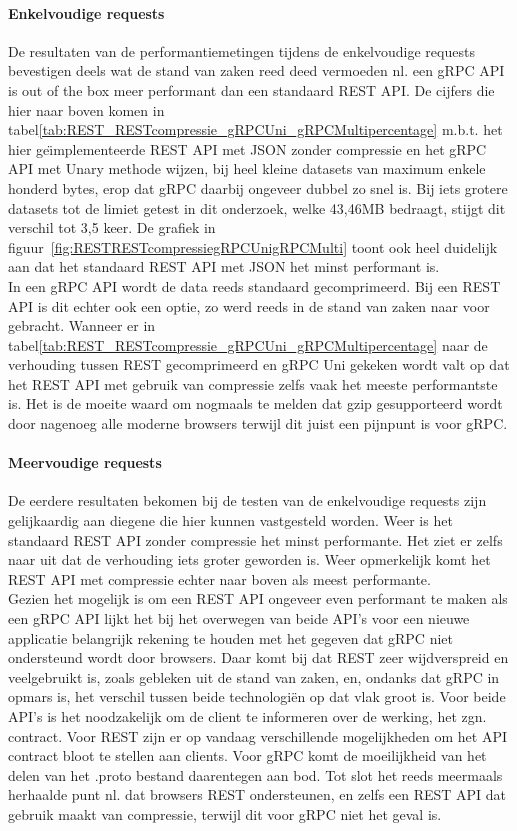 \paragraph{Enkelvoudige requests}
De resultaten van de performantiemetingen tijdens de enkelvoudige requests bevestigen deels wat de stand van zaken reed deed vermoeden nl. een gRPC API is out of the box
meer performant dan een standaard REST API. De cijfers die hier naar boven komen in tabel\ref{tab:REST_RESTcompressie_gRPCUni_gRPCMultipercentage} m.b.t.
het hier ge\"{\i}mplementeerde REST API met JSON zonder compressie en het gRPC API met Unary methode wijzen, bij heel kleine datasets van maximum enkele honderd bytes, erop dat gRPC
daarbij ongeveer dubbel zo snel is. Bij iets grotere datasets tot de limiet getest in dit onderzoek, welke 43,46MB bedraagt, stijgt dit verschil tot 3,5 keer.
De grafiek in figuur~\ref{fig:RESTRESTcompressiegRPCUnigRPCMulti} toont ook heel duidelijk aan dat het standaard REST API met JSON het minst performant is.\\
In een gRPC API wordt de data reeds standaard gecomprimeerd. Bij een REST API is dit echter ook een optie, zo werd reeds in de stand van zaken naar voor gebracht. Wanneer er
in tabel\ref{tab:REST_RESTcompressie_gRPCUni_gRPCMultipercentage} naar de verhouding tussen REST gecomprimeerd en gRPC Uni gekeken wordt valt op dat het REST API met gebruik van compressie
zelfs vaak het meeste performantste is. Het is de moeite waard om nogmaals te melden dat gzip gesupporteerd wordt door nagenoeg alle moderne browsers terwijl dit juist een pijnpunt is voor gRPC.\\

\paragraph{Meervoudige requests}
De eerdere resultaten bekomen bij de testen van de enkelvoudige requests zijn gelijkaardig aan diegene die hier kunnen vastgesteld worden. Weer is het standaard
REST API zonder compressie het minst performante. Het ziet er zelfs naar uit dat de verhouding iets groter geworden is. Weer opmerkelijk komt het REST API
met compressie echter naar boven als meest performante.\\

Gezien het mogelijk is om een REST API ongeveer even performant te maken als een gRPC API lijkt het bij het overwegen van beide API's voor een nieuwe applicatie
belangrijk rekening te houden met het gegeven dat gRPC niet ondersteund wordt door browsers. Daar komt bij dat REST zeer wijdverspreid en veelgebruikt is, zoals gebleken
uit de stand van zaken, en, ondanks dat gRPC in opmars is, het verschil tussen beide technologi\"en op dat vlak groot is. Voor beide API's is het noodzakelijk om
de client te informeren over de werking, het zgn. contract. Voor REST zijn er op vandaag verschillende mogelijkheden om het API contract bloot te stellen aan clients.
Voor gRPC komt de moeilijkheid van het delen van het .proto bestand daarentegen aan bod. Tot slot het reeds meermaals herhaalde punt nl. dat browsers REST ondersteunen, en zelfs
een REST API dat gebruik maakt van compressie, terwijl dit voor gRPC niet het geval is.

